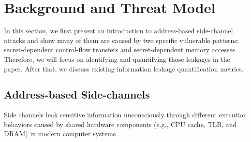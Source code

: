 \section{Background and Threat Model}
In this section, we first present an introduction to address-based side-channel
attacks and show many of them are caused by two specific vulnerable patterns: 
secret-dependent control-flow transfers and secret-dependent
memory accesses. Therefore, we will focus on identifying and quantifying those
leakages in the paper. After that, we discuss existing information leakage quantification 
metrics.

\subsection{Address-based Side-channels}
Side channels leak sensitive information
unconsciously through different execution behaviors caused by shared 
hardware components (e.g., CPU cache, TLB, and
DRAM) in modern computer systems~\cite{ge2018survey,szefer2019survey,191010,184415,Osvik2006,liu2015last,184415}. 


